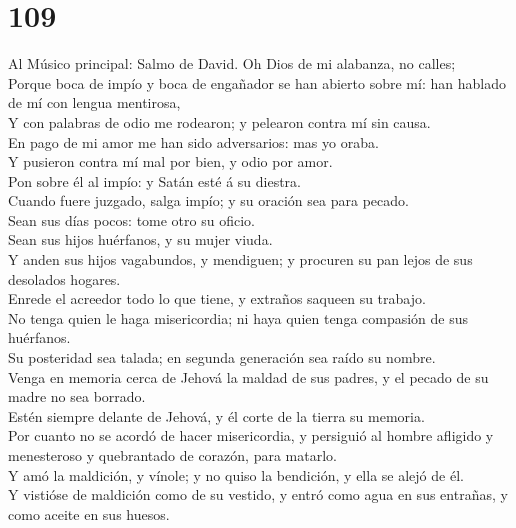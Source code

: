\hypertarget{section-19-109}{%
\section{109}\label{section-19-109}}

 Al Músico principal: Salmo de David. Oh Dios de mi
alabanza, no calles;\\
 Porque boca de impío y boca de engañador se han abierto
sobre mí: han hablado de mí con lengua mentirosa,\\
 Y con palabras de odio me rodearon; y pelearon contra mí
sin causa.\\
 En pago de mi amor me han sido adversarios: mas yo
oraba.\\
 Y pusieron contra mí mal por bien, y odio por amor.\\
 Pon sobre él al impío: y Satán esté á su diestra.\\
 Cuando fuere juzgado, salga impío; y su oración sea para
pecado.\\
 Sean sus días pocos: tome otro su oficio.\\
 Sean sus hijos huérfanos, y su mujer viuda.\\
 Y anden sus hijos vagabundos, y mendiguen; y procuren su
pan lejos de sus desolados hogares.\\
 Enrede el acreedor todo lo que tiene, y extraños saqueen
su trabajo.\\
 No tenga quien le haga misericordia; ni haya quien tenga
compasión de sus huérfanos.\\
 Su posteridad sea talada; en segunda generación sea
raído su nombre.\\
 Venga en memoria cerca de Jehová la maldad de sus
padres, y el pecado de su madre no sea borrado.\\
 Estén siempre delante de Jehová, y él corte de la tierra
su memoria.\\
 Por cuanto no se acordó de hacer misericordia, y
persiguió al hombre afligido y menesteroso y quebrantado de corazón,
para matarlo.\\
 Y amó la maldición, y vínole; y no quiso la bendición, y
ella se alejó de él.\\
 Y vistióse de maldición como de su vestido, y entró como
agua en sus entrañas, y como aceite en sus huesos.\\

